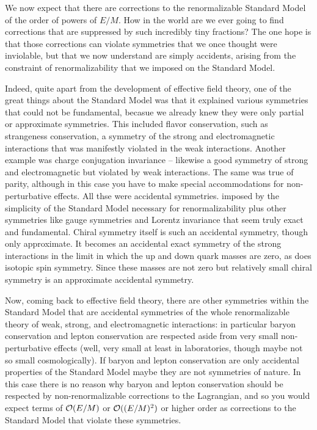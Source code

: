 \documentclass[12pt]{article}
\begin{document}
We now expect that there are corrections to the renormalizable Standard Model of the order of powers of $E/M$. How in the world are we ever going to find corrections that are suppressed by such incredibly tiny fractions? The one hope  is that those corrections can violate symmetries that we once thought were inviolable, but that we now understand are simply accidents, arising from the constraint of renormalizability that we imposed on the Standard Model.  

Indeed, quite apart from the development of effective field theory, one of the great things about the 
Standard Model was that it explained  various symmetries that could not be fundamental, becasue  we already knew they were only partial or approximate symmetries.  This included  flavor conservation, such as strangeness conservation,  a symmetry of the strong and electromagnetic interactions that was manifestly violated in the weak interactions.  Another example was charge conjugation invariance -- likewise a good symmetry of strong and electromagnetic but violated by weak interactions. The same was true of parity, although in this case you have to make special accommodations for non-perturbative effects.  All thse were accidental symmetries.  imposed  by the simplicity of the Standard Model necessary for renormalizability plus  other symmetries like gauge symmetries and Lorentz invariance that seem truly exact and fundamental.  
Chiral symmetry itself is such an accidental symmetry, though only approximate. It becomes an accidental exact symmetry of the strong interactions in the limit in which  the up and down quark masses are zero, as does isotopic spin symmetry. Since these masses  are not zero but relatively small chiral symmetry is an approximate accidental symmetry.  

Now, coming back to effective field theory, there are other symmetries within the Standard Model that are accidental symmetries of the whole renormalizable theory of weak, strong, and electromagnetic interactions: in particular baryon conservation and lepton conservation are respected aside from very small non-perturbative effects  (well, very small at least in laboratories, though maybe not so small cosmologically). If baryon and lepton conservation  are only accidental properties of the Standard Model maybe they are not symmetries of nature. In this case there is no reason why baryon and lepton conservation should be respected by  non-renormalizable corrections  to the Lagrangian, and so you would expect terms of ${\cal O}(E/M)$ or ${\cal O}((E/M)^2)$ or  higher order as corrections to the Standard Model that violate these symmetries.
\end{document}
